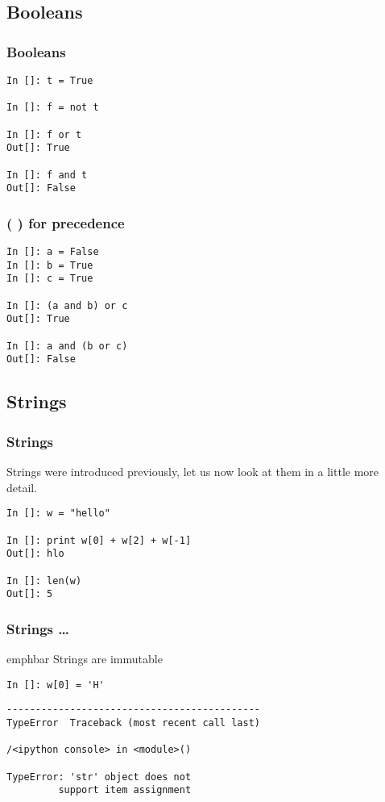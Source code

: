 \documentclass[14pt,compress]{beamer}
\newcommand{\emphbar}[1]
{\begin{beamercolorbox}[rounded=true]{emphbar} 
      {#1}
 \end{beamercolorbox}
}
\newcounter{time}
\newcommand{\inctime}[1]{\addtocounter{time}{#1}{\tiny \thetime\ m}}
\begin{document}
\subsection{Booleans}
\begin{frame}[fragile]
  \frametitle{Booleans}
  \begin{lstlisting}
In []: t = True

In []: f = not t

In []: f or t
Out[]: True

In []: f and t
Out[]: False
  \end{lstlisting}
  \inctime{5}
\end{frame}

\begin{frame}[fragile]
  \frametitle{( )  for precedence}
  \begin{lstlisting}
In []: a = False
In []: b = True
In []: c = True

In []: (a and b) or c
Out[]: True

In []: a and (b or c)
Out[]: False
  \end{lstlisting}
  \inctime{5}
\end{frame}

\subsection{Strings}

\begin{frame}[fragile]
  \frametitle{Strings}
Strings were introduced previously, let us now look at them in a little more detail.
  \begin{lstlisting}
In []: w = "hello"

In []: print w[0] + w[2] + w[-1]
Out[]: hlo

In []: len(w)
Out[]: 5
  \end{lstlisting}
\end{frame}

\begin{frame}[fragile]
  \frametitle{Strings \ldots}
  \emphbar{Strings are immutable}
  \begin{lstlisting}
In []: w[0] = 'H' 
  \end{lstlisting}
  \pause
  \begin{lstlisting}
--------------------------------------------
TypeError  Traceback (most recent call last)

/<ipython console> in <module>()

TypeError: 'str' object does not
         support item assignment
  \end{lstlisting}
\end{frame}
\end{document}
